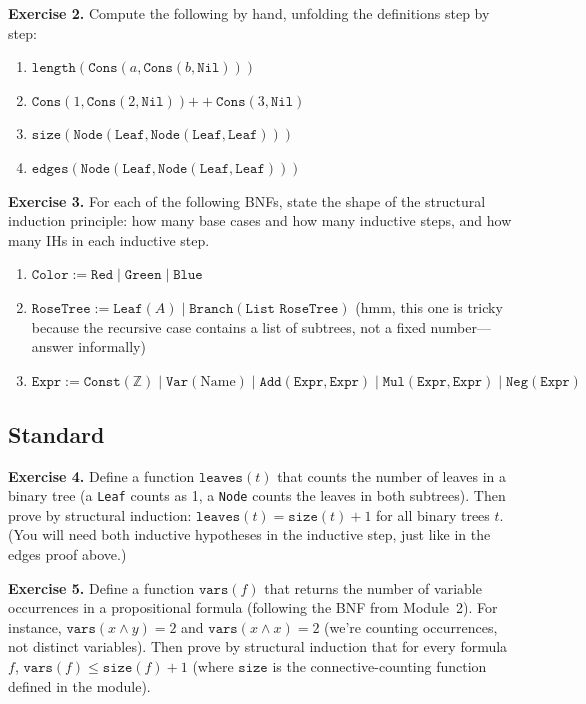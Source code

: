\documentclass[11pt]{article}
\begin{document}
\bigskip
\textbf{Exercise 2.}\label{ex:m10:2} Compute the following by hand, unfolding the definitions step by step:
\begin{enumerate}[label=(\alph*)]
  \item $\texttt{length}(\texttt{Cons}(a, \texttt{Cons}(b, \texttt{Nil})))$
  \item $\texttt{Cons}(1, \texttt{Cons}(2, \texttt{Nil})) \mathbin{++} \texttt{Cons}(3, \texttt{Nil})$
  \item $\texttt{size}(\texttt{Node}(\texttt{Leaf}, \texttt{Node}(\texttt{Leaf}, \texttt{Leaf})))$
  \item $\texttt{edges}(\texttt{Node}(\texttt{Leaf}, \texttt{Node}(\texttt{Leaf}, \texttt{Leaf})))$
\end{enumerate}

\bigskip
\textbf{Exercise 3.}\label{ex:m10:3} For each of the following BNFs, state the shape of the structural induction principle: how many base cases and how many inductive steps, and how many IHs in each inductive step.
\begin{enumerate}[label=(\alph*)]
  \item $\texttt{Color} := \texttt{Red} \mid \texttt{Green} \mid \texttt{Blue}$
  \item $\texttt{RoseTree} := \texttt{Leaf}(A) \mid \texttt{Branch}(\texttt{List RoseTree})$ (hmm, this one is tricky because the recursive case contains a list of subtrees, not a fixed number---answer informally)
  \item $\texttt{Expr} := \texttt{Const}(\mathbb{Z}) \mid \texttt{Var}(\text{Name}) \mid \texttt{Add}(\texttt{Expr}, \texttt{Expr}) \mid \texttt{Mul}(\texttt{Expr}, \texttt{Expr}) \mid \texttt{Neg}(\texttt{Expr})$
\end{enumerate}

\subsection*{Standard}

\textbf{Exercise 4.}\label{ex:m10:4} Define a function $\texttt{leaves}(t)$ that counts the number of leaves in a binary tree (a \texttt{Leaf} counts as 1, a \texttt{Node} counts the leaves in both subtrees). Then prove by structural induction: $\texttt{leaves}(t) = \texttt{size}(t) + 1$ for all binary trees $t$. (You will need both inductive hypotheses in the inductive step, just like in the edges proof above.)

\bigskip
\textbf{Exercise 5.}\label{ex:m10:5} Define a function $\texttt{vars}(f)$ that returns the number of variable occurrences in a propositional formula (following the BNF from Module~2). For instance, $\texttt{vars}(x \wedge y) = 2$ and $\texttt{vars}(x \wedge x) = 2$ (we're counting occurrences, not distinct variables). Then prove by structural induction that for every formula $f$, $\texttt{vars}(f) \leq \texttt{size}(f) + 1$ (where $\texttt{size}$ is the connective-counting function defined in the module).
\end{document}
